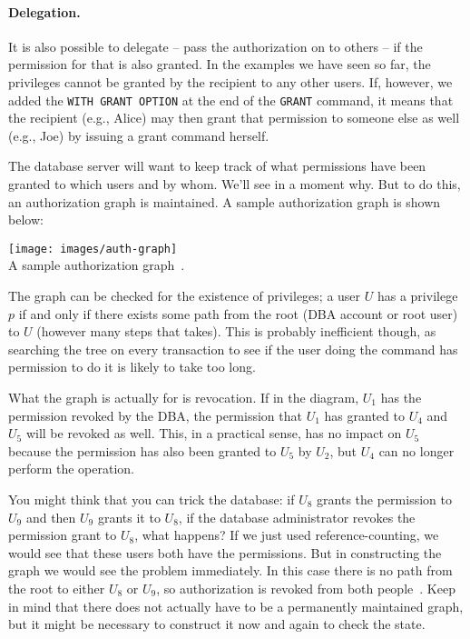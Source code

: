 \documentclass[a4paper]{report}
\begin{document}
\paragraph{Delegation.}
It is also possible to delegate -- pass the authorization on to others -- if the permission for that is also granted. In the examples we have seen so far, the privileges cannot be granted by the recipient to any other users. If, however, we added the \texttt{WITH GRANT OPTION} at the end of the \texttt{GRANT} command, it means that the recipient (e.g., Alice) may then grant that permission to someone else as well (e.g., Joe) by issuing a grant command herself.

The database server will want to keep track of what permissions have been granted to which users and by whom. We'll see in a moment why. But to do this, an authorization graph is maintained. A sample authorization graph is shown below:

\begin{center}
\texttt{[image: images/auth-graph]}\\
A sample authorization graph~\cite{dsc}.
\end{center}

The graph can be checked for the existence of privileges; a user $U$ has a privilege $p$ if and only if there exists some path from the root (DBA account or root user) to $U$ (however many steps that takes). This is probably inefficient though, as searching the tree on every transaction to see if the user doing the command has permission to do it is likely to take too long. 

What the graph is actually for is revocation. If in the diagram, $U_{1}$ has the permission revoked by the DBA, the permission that $U_{1}$ has granted to $U_{4}$ and $U_{5}$ will be revoked as well. This, in a practical sense, has no impact on $U_{5}$ because the permission has also been granted to $U_{5}$ by $U_{2}$, but $U_{4}$ can no longer perform the operation.

You might think that you can trick the database: if $U_{8}$ grants the permission to $U_{9}$ and then $U_{9}$ grants it to $U_{8}$, if the database administrator revokes the permission grant to $U_{8}$, what happens? If we just used reference-counting, we would see that these users both have the permissions. But in constructing the graph we would see the problem immediately. In this case there is no path from the root to either $U_{8}$ or $U_{9}$, so authorization is revoked from both people~\cite{dsc}. Keep in mind that there does not actually have to be a permanently maintained graph, but it might be necessary to construct it now and again to check the state.
\end{document}
